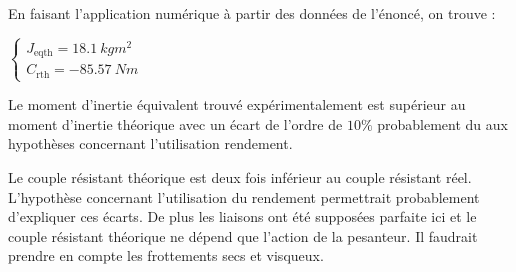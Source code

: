 \ifprof
\begin{corrige}
En faisant l'application numérique à partir des données de l'énoncé, on trouve : 

$
\left\{
\begin{array}{c}
J_{\text{eqth}}=\SI{18,1}{kg m^2} \\
C_{\text{rth}}=-\SI{85,57}{N m}
\end{array}
\right.
$

Le moment d'inertie équivalent trouvé expérimentalement est supérieur au moment d'inertie théorique avec un écart de l'ordre de $10\%$ probablement du aux hypothèses concernant l'utilisation rendement.

Le couple résistant théorique est deux fois inférieur au couple résistant réel. L'hypothèse concernant l'utilisation du rendement permettrait probablement d'expliquer ces écarts. De plus les liaisons ont été supposées parfaite ici et le couple résistant théorique ne dépend que l'action de la pesanteur. Il faudrait prendre en compte les frottements secs et visqueux. 
\end{corrige}
\else
\fi
